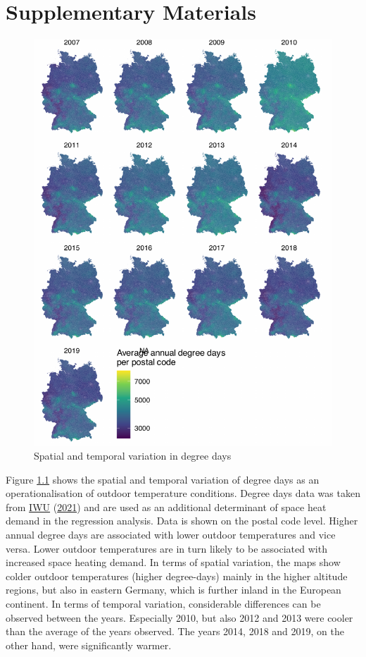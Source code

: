 \documentclass[12pt,twoside]{reedthesis}
\begin{document}
\appendix

\hypertarget{supplementary-materials}{%
\chapter{Supplementary Materials}\label{supplementary-materials}}

\singlespacing
\newpage
\begin{figure}

{\centering \includegraphics[width=0.72\linewidth]{figure/distribution_degree_days} 

}

\caption{Spatial and temporal variation in degree days}\label{fig:degree-days-distribution}
\end{figure}
\noindent
Figure \ref{fig:degree-days-distribution} shows the spatial and temporal variation of degree days as an operationalisation of outdoor temperature conditions. Degree days data was taken from \protect\hyperlink{ref-iwu21}{IWU} (\protect\hyperlink{ref-iwu21}{2021}) and are used as an additional determinant of space heat demand in the regression analysis. Data is shown on the postal code level. Higher annual degree days are associated with lower outdoor temperatures and vice versa. Lower outdoor temperatures are in turn likely to be associated with increased space heating demand. In terms of spatial variation, the maps show colder outdoor temperatures (higher degree-days) mainly in the higher altitude regions, but also in eastern Germany, which is further inland in the European continent. In terms of temporal variation, considerable differences can be observed between the years. Especially 2010, but also 2012 and 2013 were cooler than the average of the years observed. The years 2014, 2018 and 2019, on the other hand, were significantly warmer.
\end{document}
